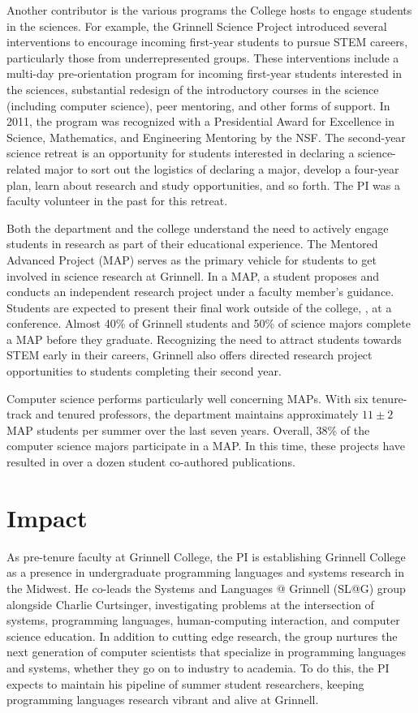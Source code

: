 \documentclass[11pt]{article}
\begin{document}
Another contributor is the various programs the College hosts to engage students in the sciences.
For example, the Grinnell Science Project introduced several interventions to encourage incoming first-year students to pursue STEM careers, particularly those from underrepresented groups.
These interventions include a multi-day pre-orientation program for incoming first-year students interested in the sciences, substantial redesign of the introductory courses in the science (including computer science), peer mentoring, and other forms of support.
In 2011, the program was recognized with a Presidential Award for Excellence in Science, Mathematics, and Engineering Mentoring by the NSF.
The second-year science retreat is an opportunity for students interested in declaring a science-related major to sort out the logistics of declaring a major, develop a four-year plan, learn about research and study opportunities, and so forth.
The PI was a faculty volunteer in the past for this retreat.

Both the department and the college understand the need to actively engage students in research as part of their educational experience.
The Mentored Advanced Project (MAP) serves as the primary vehicle for students to get involved in science research at Grinnell.
In a MAP, a student proposes and conducts an independent research project under a faculty member's guidance.
Students are expected to present their final work outside of the college, \eg, at a conference.
Almost 40\% of Grinnell students and 50\% of science majors complete a MAP before they graduate.
Recognizing the need to attract students towards STEM early in their careers, Grinnell also offers directed research project opportunities to students completing their second year.

Computer science performs particularly well concerning MAPs.
With six tenure-track and tenured professors, the department maintains approximately $11 \pm 2$ MAP students per summer over the last seven years.
Overall, 38\% of the computer science majors participate in a MAP.
In this time, these projects have resulted in over a dozen student co-authored publications.

\section{Impact}

As pre-tenure faculty at Grinnell College, the PI is establishing Grinnell College as a presence in undergraduate programming languages and systems research in the Midwest.
He co-leads the Systems and Languages @ Grinnell (SL@G) group alongside Charlie Curtsinger, investigating problems at the intersection of systems, programming languages, human-computing interaction, and computer science education.
In addition to cutting edge research, the group nurtures the next generation of computer scientists that specialize in programming languages and systems, whether they go on to industry to academia.
To do this, the PI expects to maintain his pipeline of summer student researchers, keeping programming languages research vibrant and alive at Grinnell.
\end{document}
